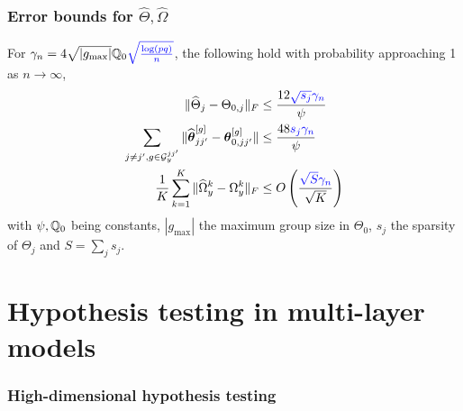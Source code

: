 \documentclass[10pt]{beamer}
\theoremstyle{definition}
\DeclareMathOperator*{\supp}{\text{supp}}
\begin{document}
\begin{frame}
\frametitle{Error bounds for $\widehat \Theta, \widehat\Omega$}

For $\gamma_n = 4 \sqrt{| g_{\max}|} {\mathbb{Q}}_0 {\color{blue} \sqrt{ \frac{ \log(pq)}{n}}}$, the following hold with probability approaching 1 as $n \rightarrow \infty$,
%
\begin{align*}
\| \widehat \Theta_j - \Theta_{0,j} \|_F & \leq \frac{12 {\color{blue} \sqrt{s_j} \gamma_n}}{\psi} \\
\sum_{j \neq j', g \in {\cal{G}}_y^{jj'}} \| \widehat {{\boldsymbol{\theta}}}_{jj'}^{[g]} - {\boldsymbol{\theta}}_{0,jj'}^{[g]} \| & \leq \frac{48 {\color{blue} s_j \gamma_n}}{\psi} \\
\frac{1}{K} \sum_{k=1}^K \| \widehat \Omega_y^k - \Omega_y^k \|_F & \leq
O \left( \frac{{\color{blue} \sqrt S \gamma_n }}{\sqrt K} \right)\\
\end{align*}
%
with $\psi, {\mathbb{Q}}_0$ being constants, $| g_{\max} |$ the maximum group size in $\Theta_0$, $s_j$ the sparsity of $\Theta_j$ and $S = \sum_j s_j$.
\end{frame}

\section{Hypothesis testing in multi-layer models}

\begin{frame}
\frametitle{High-dimensional hypothesis testing}

\end{frame}
\end{document}
